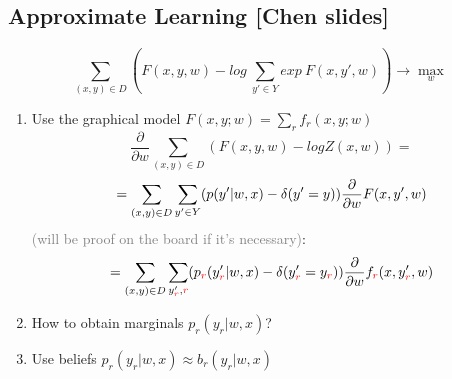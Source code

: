 \documentclass{beamer}
\begin{document}
\subsection*{Approximate Learning [Chen slides]}

\begin{frame}
	$$\sum_{(x, y) \in D} \left(F(x, y, w) - log~\sum_{y' \in Y} exp~F(x, y', w)\right) \rightarrow \max_{w}$$
	\begin{enumerate}
		\item Use the graphical model $F(x, y; w) = \sum_{r} f_r(x, y; w)$
			$$\frac{\partial}{\partial w} \sum_{(x, y) \in D} \left( F(x, y, w) - logZ(x, w) \right) =$$
			$$= \sum_{(x, y) \in D} \sum_{y' \in Y} (\textcolor{black}{p(y'|w, x)} - \delta(y'=y)) \frac{\partial}{\partial w} F(x, y', w)$$ 
			\small{\textcolor{gray}{(will be proof on the board if it's necessary)}}:
			$$= \sum_{(x, y) \in D} \sum_{y'_{\textcolor{red}{r}}, {\textcolor{red}{r}}} (\textcolor{black}{p_{ {\textcolor{red}{r}}}(y'_{\textcolor{red}{r}}|w, x)} - \delta(y'_{\textcolor{red}{r}}=y_{\textcolor{red}{r}})) \frac{\partial}{\partial w} f_{\textcolor{red}{r}}(x, y'_{\textcolor{red}{r}}, w)$$ 
			
		\item How to obtain marginals $p_r(y_r|w, x)$?
		\item Use beliefs  $p_{r}(y_r|w, x) \approx b_{r}(y_r|w, x)$
	\end{enumerate}
	

\end{frame}
\end{document}
